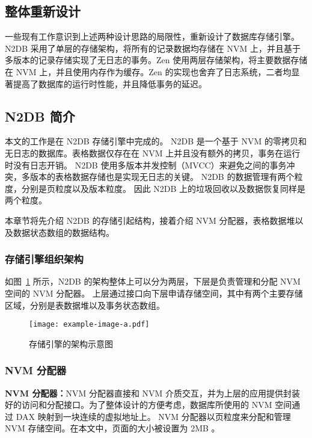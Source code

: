 \subsection{整体重新设计}

一些现有工作意识到上述两种设计思路的局限性，重新设计了数据库存储引擎。N2DB 采用了单层的存储架构，将所有的记录数据均存储在 NVM 上，并且基于多版本的记录存储实现了无日志的事务\cite{liu_graduate}。Zen 使用两层存储架构，将主要数据存储在 NVM 上，并且使用内存作为缓存。Zen 的实现也舍弃了日志系统，二者均显著提高了数据库的运行时性能，并且降低事务的延迟\cite{liu_zen_2021}。

\subsection{N2DB 简介}
本文的工作是在 N2DB 存储引擎中完成的。
N2DB 是一个基于 NVM 的零拷贝和无日志的数据库。表格数据仅存在在 NVM 上并且没有额外的拷贝，事务在运行时没有日志开销。
N2DB 使用多版本并发控制（MVCC）来避免之间的事务冲突，多版本的表格数据存储也是实现无日志的关键。
N2DB 的数据管理有两个粒度，分别是页粒度以及版本粒度。
因此 N2DB 上的垃圾回收以及数据恢复同样是两个粒度。

本章节将先介绍 N2DB 的存储引起结构，接着介绍 NVM 分配器，表格数据堆以及数据状态数组的数据结构。



\subsubsection{存储引擎组织架构}

如图~\ref{fig:n2db} 所示，N2DB 的架构整体上可以分为两层，下层是负责管理和分配 NVM 空间的 NVM 分配器。
上层通过接口向下层申请存储空间，其中有两个主要存储区域，分别是表数据堆以及事务状态数组。

\begin{figure}
    \centering
    \texttt{[image: example-image-a.pdf]}
    \caption{存储引擎的架构示意图}
    \label{fig:n2db}
\end{figure}

\subsubsection{NVM 分配器}

\textbf{NVM 分配器：}NVM 分配器直接和 NVM 介质交互，并为上层的应用提供封装好的访问和分配接口。为了整体设计的方便考虑，数据库所使用的 NVM 空间通过 DAX 映射到一块连续的虚拟地址上。
NVM 分配器以页粒度来分配和管理 NVM 存储空间。在本文中，页面的大小被设置为 2MB 。

